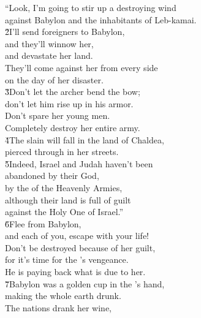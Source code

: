 \begin{poetry}
\poeml ``Look, I'm going to stir up a destroying wind \\
\poemll    against Babylon and the inhabitants of Leb-kamai. \\
\poeml \v{2}I'll send foreigners to Babylon, \\
\poemll    and they'll winnow her, \\
\poemlll       and devastate her land. \\
\poeml They'll come against her from every side \\
\poemll    on the day of her disaster. \\
\poeml \v{3}Don't let the archer bend the bow; \\
\poemll    don't let him rise up in his armor. \\
\poeml Don't spare her young men. \\
\poemll    Completely destroy her entire army. \\
\poeml \v{4}The slain will fall in the land of Chaldea, \\
\poemll    pierced through in her streets. \\
\poeml \v{5}Indeed, Israel and Judah haven't been \\
\poemll    abandoned by their God, \\
\poeml by the  of the Heavenly Armies, \\
\poemll    although their land is full of guilt \\
\poemlll       against the Holy One of Israel.'' \\
\poeml \v{6}Flee from Babylon, \\
\poemll    and each of you, escape with your life! \\
\poeml Don't be destroyed because of her guilt, \\
\poemll    for it's time for the 's vengeance. \\
\poemlll       He is paying back what is due to her. \\
\poeml \v{7}Babylon was a golden cup in the 's hand, \\
\poemll    making the whole earth drunk. \\
\poeml The nations drank her wine, \\

\end{poetry}
